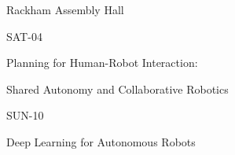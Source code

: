 \documentclass{article}
\begin{document}
\rssheader[1in]

\fontsize{32pt}{36pt}
\selectfont
\begin{center}
Rackham Assembly Hall
\end{center}

\vfill

\fontsize{48pt}{56pt}
\selectfont
\begin{center}
SAT-04
\end{center}

\fontsize{24pt}{28pt}
\selectfont
\begin{center}
Planning for Human-Robot Interaction: \par \noindent Shared Autonomy and Collaborative Robotics
\end{center}

\vfill

\fontsize{48pt}{56pt}
\selectfont
\begin{center}
SUN-10
\end{center}

\fontsize{24pt}{24pt}
\selectfont
\begin{center}
Deep Learning for Autonomous Robots
\end{center}

\vfill
\end{document}
